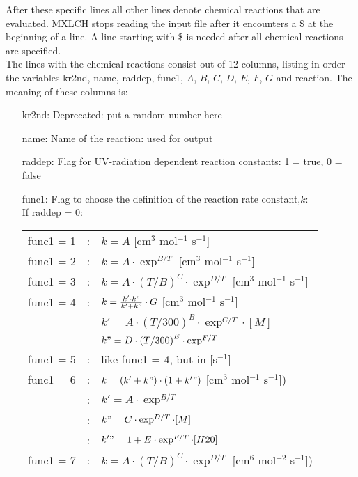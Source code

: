 \documentclass[twoside,11pt,fleqn,a4paper,english,openright]{report}
\begin{document}
After these specific lines all other lines denote chemical reactions that are evaluated. MXLCH stops reading the input file after it encounters a \$ at the beginning of a line. A line starting with \$ is needed after all chemical reactions are specified.\\
The lines with the chemical reactions consist out of 12 columns, listing in order the variables kr2nd, name, raddep, func1, $A$, $B$, $C$, $D$, $E$, $F$, $G$ and reaction. The meaning of these columns is:
\begin{itemize}
\item[kr2nd:] Deprecated: put a random number here
\item[name:]  Name of the reaction: used for output
\item[raddep:] Flag for UV-radiation dependent reaction constants: 1 = true, 0 = false
\item[func1:] Flag to choose the definition of the reaction rate constant,$k$:\\ $\,$ \\
				If raddep = 0:\\ 
				\begin{tabular}{lcl}
				func1 = 1 & : & $k=A$ [cm$^3$ mol$^{-1}$ s$^{-1}$]  \\
				func1 = 2 & : & $k = A \cdot \exp^{B/T}$ [cm$^3$ mol$^{-1}$ s$^{-1}$] \\
				func1 = 3 & : & $k = A \cdot \left(T/B\right)^C \cdot \exp^{D/T}$ [cm$^3$ mol$^{-1}$ s$^{-1}$]\\
				func1 = 4 & : & $k = \frac{k' \cdot k"}{k'+ k"}\cdot G $ [cm$^3$ mol$^{-1}$ s$^{-1}$]\\
				          &   & $k'= A \cdot \left(T/300\right)^B \cdot \exp^{C/T} \cdot [M]$\\
				          &   & $k"= D \cdot \left(T/300\right)^E \cdot \exp^{F/T}$\\
				func1 = 5 & : & like func1 = 4, but in [s$^{-1}$]\\
				func1 = 6 & : & $k = \left(k'+ k"\right)\cdot\left(1+k'"\right)$ [cm$^3$ mol$^{-1}$ s$^{-1}$])\\
						  & : & $k'= A \cdot \exp^{B/T}$\\
						  & : & $k"= C \cdot \exp^{D/T}\cdot[M]$\\
						  & : & $k'" = 1 + E \cdot \exp^{F/T}\cdot[H20]$\\
				func1 = 7 & : & $k = A \cdot \left(T/B\right)^C \cdot \exp^{D/T}$ [cm$^6$ mol$^{-2}$ s$^{-1}$])
				\end{tabular}
				$\,$ \\ $\,$ \\

\end{itemize}
\end{document}

